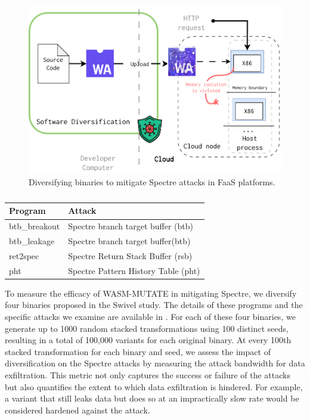 \begin{figure}[h]
    \centering
    \includegraphics[width=0.75\linewidth]{figures/edge_protected.pdf}
    \caption{Diversifying \Wasm binaries to mitigate Spectre attacks in FaaS platforms.}
    \label{fig:defense_model}
\end{figure}

\begin{table}
    \centering
    \begin{tabular}{l | l  }
        \hline
         Program &  Attack  \\
        \hline \hline
        btb\_breakout & Spectre branch target buffer (btb)  \\
        \hline
         btb\_leakage & Spectre branch target buffer(btb)  \\
        \hline
         ret2spec &  Spectre Return Stack Buffer (rsb)  \\
        \hline
        pht &  Spectre Pattern History Table (pht)  \\

    \end{tabular}
    \caption{}
    \label{programs}
\end{table}

To measure the efficacy of WASM-MUTATE in mitigating Spectre, we diversify four \Wasm binaries proposed in the Swivel study. 
The details of these programs and the specific attacks we examine are available in \cite{programs}. 
For each of these four binaries, we generate up to 1000 random stacked transformations using 100 distinct seeds, resulting in a total of 100,000 variants for each original binary. 
At every 100th stacked transformation for each binary and seed, we assess the impact of diversification on the Spectre attacks by measuring the attack bandwidth for data exfiltration. 
This metric not only captures the success or failure of the attacks but also quantifies the extent to which data exfiltration is hindered. 
For example, a variant that still leaks data but does so at an impractically slow rate would be considered hardened against the attack.

